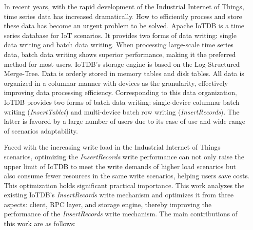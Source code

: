 \begin{abstract*}

  In recent years, with the rapid development of the Industrial Internet of Things, time series data has increased dramatically. How to efficiently process and store these data has become an urgent problem to be solved. Apache IoTDB is a time series database for IoT scenarios. It provides two forms of data writing: single data writing and batch data writing. When processing large-scale time series data, batch data writing shows superior performance, making it the preferred method for most users. IoTDB's storage engine is based on the Log-Structured Merge-Tree. Data is orderly stored in memory tables and disk tables. All data is organized in a columnar manner with devices as the granularity, effectively improving data processing efficiency. Corresponding to this data organization, IoTDB provides two forms of batch data writing: single-device columnar batch writing (\emph{InsertTablet}) and multi-device batch row writing (\emph{InsertRecords}). The latter is favored by a large number of users due to its ease of use and wide range of scenarios adaptability.

  Faced with the increasing write load in the Industrial Internet of Things scenarios, optimizing the \emph{InsertRecords} write performance can not only raise the upper limit of IoTDB to meet the write demands of higher load scenarios but also consume fewer resources in the same write scenarios, helping users save costs. This optimization holds significant practical importance. This work analyzes the existing IoTDB's \emph{InsertRecords} write mechanism and optimizes it from three aspects: client, RPC layer, and storage engine, thereby improving the performance of the \emph{InsertRecords} write mechanism. The main contributions of this work are as follows:
  

\end{abstract*}
